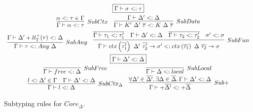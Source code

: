 \documentclass[11pt]{article}
\newcommand{\mathframebox}[1]{\framebox{$\displaystyle #1$}}
\newcommand{\ap}{~}
\newcommand{\ctx}[1]{ctx\left(#1\right)~}
\begin{document}
    \begin{figure}
        \begin{gather*}
            \mathframebox{\Gamma\vdash \sigma <: \tau} \\
            \begin{array}{cc}
                \infer[SubCtx]{\Gamma\vdash \alpha <: \tau}{\alpha <: \tau \in \Gamma} &
                \infer[SubData]{
                    \Gamma\vdash K'\ap\Delta'\ap\overline{\tau} <: K\ap\Delta\ap\overline{\tau}
                }{
                    \Gamma\vdash\Delta' <: \Delta
                }
            \end{array} \\
            \begin{array}{cc}
                \infer[SubAny]{
                    \Gamma\vdash \tau <: Any\ap\Delta
                }{
                    \Gamma\vdash \Delta'+lt_\Gamma^+(\tau) <: \Delta
                } &
                \infer[SubFun]{
                    \Gamma\vdash\ctx{\overline{\tau_1'}}\Delta'~\overline{\tau_2'}\to\sigma' <: \ctx{\overline{\tau_1}}\Delta~\overline{\tau_2}\to\sigma
                }{
                    \overline{\Gamma\vdash\tau_1 <: \tau_1'} &
                    \Gamma\vdash\Delta' <: \Delta &
                    \overline{\Gamma\vdash\tau_2 <: \tau_2'} &
                    \sigma' <: \sigma
                }
            \end{array} \\
            \mathframebox{\Gamma\vdash\Delta' <: \Delta} \\
            \begin{array}{cc}
                \infer[SubFree]{\Gamma\vdash free <: \Delta}{} &
                \infer[SubLocal]{\Gamma\vdash\Delta <: local}{} \\
                \infer[SubCtx_\Delta]{
                    \Gamma\vdash l <: \Delta
                }{
                    l <: \Delta' \in \Gamma & \Gamma\vdash\Delta' <: \Delta
                } &
                \infer[Sub+]{
                    \Gamma\vdash+\overline{\Delta'} <: +\overline{\Delta}
                }{
                    \forall\Delta'\in\overline{\Delta'}\ldotp\exists\Delta\in\overline{\Delta}\ldotp \Gamma\vdash\Delta' <: \Delta
                }
            \end{array}
        \end{gather*}
        \caption{Subtyping rules for $Core_{\Delta}$.}
        \label{fig:core-delta-subtyping}
    \end{figure}
\end{document}
